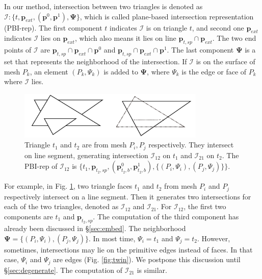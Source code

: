 \documentclass[10pt,journal,compsoc]{IEEEtran}
\begin{document}
In our method, intersection between two triangles is denoted as $\bm{\mathcal{I}}\colon\{t, \bm{p}_{ext}, (\bm{p}^0, \bm{p}^1),\bm{\Psi}\}$, which is called plane-based intersection representation (PBI-rep). The first component $t$ indicates $\bm{\mathcal{I}}$ is on triangle $t$, and second one $\bm{p}_{ext}$ indicates $\bm{\mathcal{I}}$ lies on $\bm{p}_{ext}$, which also means it lies on line $\bm{p}_{t, sp} \cap \bm{p}_{ext}$. The two end points of $\bm{\mathcal{I}}$ are $\bm{p}_{t, sp} \cap \bm{p}_{ext}\cap\bm{p}^0$ and $\bm{p}_{t, sp} \cap \bm{p}_{ext}\cap\bm{p}^1$. The last component $\bm{\Psi}$ is a set that represents the neighborhood of the intersection. If $\bm{\mathcal{I}}$ is on the surface of mesh $P_k$, an element $(P_{k}, \Psi_{k})$ is added to $\bm{\Psi}$, where $\Psi_{k}$ is the edge or face of $P_k$ where $\bm{\mathcal{I}}$ lies.

\begin{figure}[t]
\centering
\includegraphics[width=3.5in]{pbirep}
\caption{Triangle $t_1$ and $t_2$ are from mesh $P_i, P_j$ respectively. They intersect on line segment, generating intersection $\bm{\mathcal{I}}_{12}$ on $t_1$ and $\bm{\mathcal{I}}_{21}$ on $t_2$. The PBI-rep of $\bm{\mathcal{I}}_{12}$ is $\{t_1, \bm{p}_{t_2, sp}, (\bm{p}_{t_2, b}^0, \bm{p}_{t_2, b}^1),\{(P_i, \Psi_i), (P_j, \Psi_j)\}\}$.}
\label{fig:pbi}
\end{figure}

For example, in Fig. \ref{fig:pbi}, two triangle faces $t_1$ and $t_2$ from mesh $P_i$ and $P_j$ respectively intersect on a line segment. Then it generates two intersections for each of the two triangles, denoted as ${\bm{\mathcal{I}}}_{12}$ and ${\bm{\mathcal{I}}}_{21}$. For ${\bm{\mathcal{I}}}_{12}$, the first two components are $t_1$ and $\bm{p}_{t_2, sp}$. The computation of the third component has already been discussed in \S\ref{sec:embed}. The neighborhood $\bm{\Psi} = \{(P_i, \Psi_i), (P_j, \Psi_j)\}$. In most time, $\Psi_i=t_1$ and $\Psi_j=t_2$. However, sometimes, intersections may lie on the primitive edges instead of faces. In that case, $\Psi_i$ and $\Psi_j$ are edges (Fig. \ref{fig:twin}). We postpone this discussion until \S\ref{sec:degenerate}. The computation of ${\bm{\mathcal{I}}}_{21}$ is similar.
\end{document}
